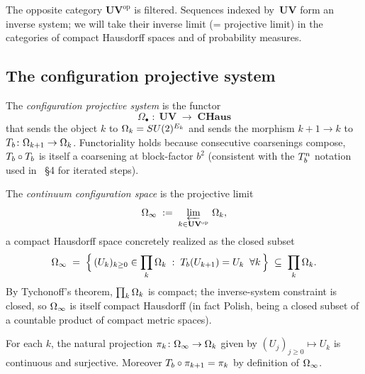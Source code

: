 The opposite category $\mathbf{UV}^{\mathrm{op}}$ is filtered.
Sequences indexed by~$\mathbf{UV}$ form an inverse system; we will
take their inverse limit (= projective limit) in the categories of
compact Hausdorff spaces and of probability measures.

\subsection{The configuration projective system}
\label{subsec:config-system}

\begin{definition}
\label{def:config-system}
The \emph{configuration projective system} is the functor
\begin{equation*}
  \Omega_\bullet \;\colon\; \mathbf{UV} \;\longrightarrow\; \mathbf{CHaus}
\end{equation*}
that sends the object $k$ to $\Omega_k = SU(2)^{E_k}$ and sends the
morphism $k+1 \to k$ to $T_b \colon \Omega_{k+1} \to \Omega_k$.  Functoriality
holds because consecutive coarsenings compose, $T_b \circ T_b$ is
itself a coarsening at block-factor $b^2$ (consistent with the
$T_b^n$ notation used in ~\S4
for iterated steps).
\end{definition}

\begin{definition}
\label{def:proj-limit-config}
The \emph{continuum configuration space} is the projective limit
\begin{equation*}
  \Omega_\infty \;:=\; \varprojlim_{k \in \mathbf{UV}^{\mathrm{op}}} \, \Omega_k,
\end{equation*}
a compact Hausdorff space concretely realized as the closed subset
\begin{equation*}
  \Omega_\infty \;=\; \Bigl\{ \, (U_k)_{k \ge 0} \in \prod_k \Omega_k
                     \;:\;
                     T_b(U_{k+1}) = U_k \;\; \forall k \, \Bigr\}
              \;\subseteq\; \prod_k \Omega_k.
\end{equation*}
By Tychonoff's theorem, $\prod_k \Omega_k$ is compact; the inverse-system
constraint is closed, so $\Omega_\infty$ is itself compact Hausdorff (in fact
Polish, being a closed subset of a countable product of compact metric
spaces).
\end{definition}

\begin{proposition}
\label{prop:projections}
For each $k$, the natural projection
$\pi_k \colon \Omega_\infty \to \Omega_k$ given by $(U_j)_{j \ge 0} \mapsto U_k$
is continuous and surjective.  Moreover $T_b \circ \pi_{k+1} = \pi_k$
by definition of $\Omega_\infty$.
\end{proposition}

